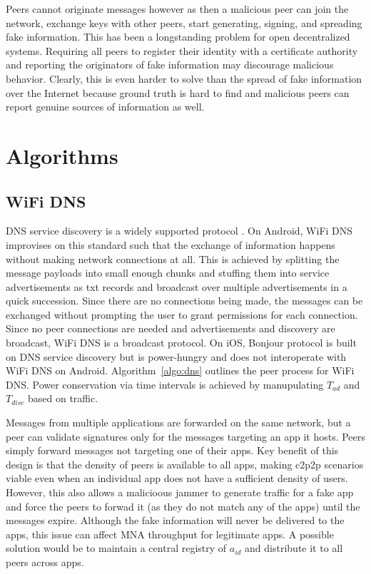 \documentclass[conference]{IEEEtran}
\begin{document}
Peers cannot originate messages however as then a malicious peer can
join the network, exchange keys with other peers, start generating,
signing, and spreading fake information. This has been a longstanding
problem for open decentralized systems. Requiring all peers to
register their identity with a certificate authority and reporting the
originators of fake information may discourage malicious behavior.
Clearly, this is even harder to solve than the spread of fake
information over the Internet because ground truth is hard to find and
malicious peers can report genuine sources of information as well.
%
\section{Algorithms}
\label{sec:algo}
%
\subsection{WiFi DNS}
\label{sec:wifi}
%
DNS service discovery is a widely supported protocol
\cite{cheshire-dns-sd-2013}. On Android, WiFi DNS improvises on this
standard such that the exchange of information happens without making
network connections at all. This is achieved by splitting the message
payloads into small enough chunks and stuffing them into service
advertisements as txt records and broadcast over multiple
advertisements in a quick succession. Since there are no connections
being made, the messages can be exchanged without prompting the user
to grant permissions for each connection. Since no peer connections
are needed and advertisements and discovery are broadcast, WiFi DNS is
a broadcast protocol. On iOS, Bonjour protocol is built on DNS service
discovery but is power-hungry and does not interoperate with WiFi DNS
on Android. Algorithm~\ref{algo:dns} outlines the peer process for
WiFi DNS. Power conservation via time intervals is achieved by
manupulating $T_{ad}$ and $T_{disc}$ based on traffic. 

Messages from multiple applications are forwarded on the same network,
but a peer can validate signatures only for the messages targeting an
app it hosts. Peers simply forward messages not targeting one of their
apps. Key benefit of this design is that the density of peers is
available to all apps, making c2p2p scenarios viable even when an
individual app does not have a sufficient density of users.  However,
this also allows a malicioous jammer to generate traffic for a fake
app and force the peers to forwad it (as they do not match any of the
apps) until the messages expire.  Although the fake information will
never be delivered to the apps, this issue can affect MNA throughput
for legitimate apps. A possible solution would be to maintain a
central registry of $a_{id}$ and distribute it to all peers across
apps.
\end{document}
